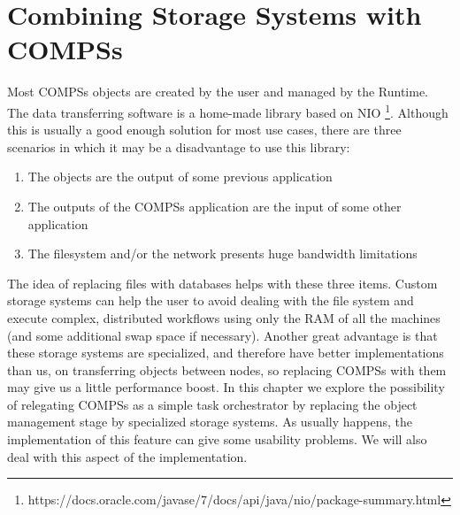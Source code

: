 \section{Combining Storage Systems with COMPSs}
\label{sec:storage}
Most COMPSs objects are created by the user and managed by the Runtime. The data transferring software is a home-made library based on NIO \footnote{https://docs.oracle.com/javase/7/docs/api/java/nio/package-summary.html}. Although this is usually a good enough solution for most use cases, there are three scenarios in which it may be a disadvantage to use this library:

\begin{enumerate}
\item The objects are the output of some previous application
\item The outputs of the COMPSs application are the input of some other application
\item The filesystem and/or the network presents huge bandwidth limitations
\end{enumerate}

The idea of replacing files with databases helps with these three items. Custom storage systems can help the user to avoid dealing with the file system and execute complex, distributed workflows using only the RAM of all the machines (and some additional swap space if necessary). Another great advantage is that these storage systems are specialized, and therefore have better implementations than us, on transferring objects between nodes, so replacing COMPSs with them may give us a little performance boost. In this chapter we explore the possibility of relegating COMPSs as a simple task orchestrator by replacing the object management stage by specialized storage systems. As usually happens, the implementation of this feature can give some usability problems. We will also deal with this aspect of the implementation.


